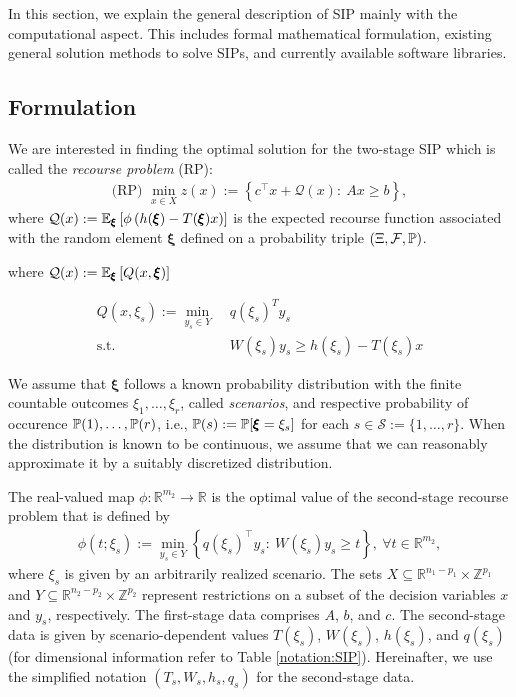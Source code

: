 In this section, we explain the general description of SIP mainly with the computational aspect. This includes formal mathematical formulation, existing general solution methods to solve SIPs, and currently available software libraries.
\subsection{Formulation}

We are interested in finding the optimal solution for the two-stage SIP which is called the \textit{recourse problem} (RP): 
\begin{align}
\textrm{(RP) }\min_{x\in X} z(x):={\left\{c^\top x + \mathcal{Q}(x):\ Ax\ge b\right\}}, \label{eq:SIP_1}
\end{align}
where $\mathcal{Q}(x):=\operatorname*{\mathbb{E}}_{\pmb{\xi}}\left[ \phi\left( h(\pmb{\xi})-T(\pmb{\xi})x \right) \right]$ is the expected recourse function associated with the random element $\pmb{\xi}$ defined on a probability triple $(\Xi, \mathcal{F},\operatorname*{\mathbb{P}})$.

where $\mathcal{Q}(x):=\operatorname*{\mathbb{E}}_{\pmb{\xi}}\left[ Q(x,\pmb{\xi}) \right]$

\begin{align}
  Q(x,\xi_s) := \min_{y_s\in Y} \;
  & q(\xi_s)^T y_s \\
  \text{s.t.} \;
  & W(\xi_s) y_s \geq h(\xi_s) - T(\xi_s) x
\end{align}


We assume that $\pmb{\xi}$ follows a known probability distribution with the finite countable outcomes $\xi_1,\ldots,\xi_r$, called \textit{scenarios},  and respective probability of occurence $\operatorname*{\mathbb{P}}(1),\ldots,\operatorname*{\mathbb{P}}(r)$, i.e., $\operatorname*{\mathbb{P}}(s):=\operatorname*{\mathbb{P}}[\pmb{\xi}=\xi_s]$ for each $s\in\mathcal{S}:=\{1,\ldots,r\}$. When the distribution is known to be continuous, we assume that we can reasonably approximate it by a suitably discretized distribution. 

The real-valued map $\phi:\mathbb{R}^{m_2}\to\mathbb{R}$ is the optimal value of the second-stage recourse problem that is defined by
\begin{align}
\phi(t;{\xi_s}):=\min_{y_s\in Y}\left\{ q(\xi_s)^\top y_s:\ W(\xi_s)y_s \ge t \right\},\ \forall t\in\mathbb{R}^{m_2},
\end{align}
where $\xi_s$ is given by an arbitrarily realized scenario.
The sets $X\subseteq \mathbb{R}^{n_1-p_1} \times \mathbb{Z}^{p_1}$ and $Y\subseteq\mathbb{R}^{n_2-p_2} \times \mathbb{Z}^{p_2}$ represent restrictions on a subset of the decision variables $x$ and $y_s$, respectively. 
The first-stage data comprises $A$, $b$, and $c$. The second-stage data is given by scenario-dependent values $T(\xi_s)$, $W(\xi_s)$, $h(\xi_s)$, and $q(\xi_s)$ (for dimensional information refer to Table \ref{notation:SIP}). Hereinafter, we use the simplified notation $(T_s,W_s,h_s,q_s)$ for the second-stage data. 

